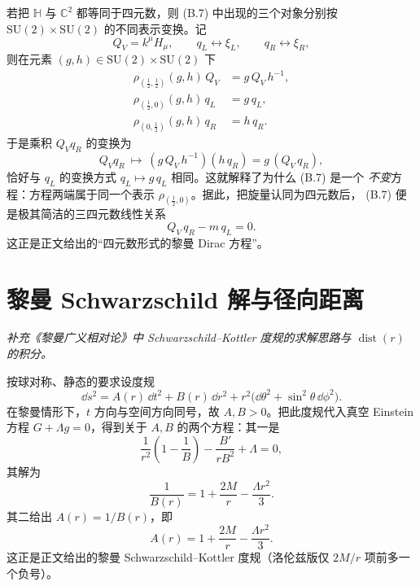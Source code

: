 若把 $\mathbb{H}$ 与 $\mathbb{C}^{2}$ 都等同于四元数，则 (B.7) 中出现的三个对象分别按
$\mathrm{SU}(2)\times\mathrm{SU}(2)$ 的不同表示变换。记
\begin{equation}
Q_{V}=k^{\mu}H_{\mu},\qquad q_{L}\leftrightarrow \xi_{L},\qquad q_{R}\leftrightarrow\xi_{R},
\end{equation}
则在元素 $(g,h)\in \mathrm{SU}(2)\times\mathrm{SU}(2)$ 下
\begin{align}
\rho_{(\frac12,\frac12)}(g,h)\,Q_{V}&=g\,Q_{V}\,h^{-1},\\
\rho_{(\frac12,0)}(g,h)\,q_{L}&=g\,q_{L},\\
\rho_{(0,\frac12)}(g,h)\,q_{R}&=h\,q_{R}.
\end{align}
于是乘积 $Q_{V}q_{R}$ 的变换为
\begin{equation}
Q_{V}q_{R}\ \longmapsto\ (g\,Q_{V}\,h^{-1})(h\,q_{R})=g\,(Q_{V}\,q_{R}),
\end{equation}
恰好与 $q_{L}$ 的变换方式 $q_{L}\mapsto g\,q_{L}$ 相同。这就解释了为什么 (B.7) 是一个
\emph{不变}方程：方程两端属于同一个表示 $\rho_{(\frac12,0)}$。据此，把旋量认同为四元数后，
(B.7) 便是极其简洁的三四元数线性关系
\begin{equation}
Q_{V}\,q_{R}-m\,q_{L}=0 . \tag{B.8}
\end{equation}
这正是正文给出的“四元数形式的黎曼 Dirac 方程”。

\section{黎曼 Schwarzschild 解与径向距离}
\emph{补充《黎曼广义相对论》中 Schwarzschild--Kottler 度规的求解思路与 $\operatorname{dist}(r)$ 的积分。}

按球对称、静态的要求设度规
\begin{equation}
\dd s^{2}=A(r)\,\dd t^{2}+B(r)\,\dd r^{2}+r^{2}\bigl(\dd\theta^{2}+\sin^{2}\theta\,\dd\phi^{2}\bigr).
\end{equation}
在黎曼情形下，$t$ 方向与空间方向同号，故 $A,B>0$。把此度规代入真空 Einstein 方程
$G+\Lambda g=0$，得到关于 $A,B$ 的两个方程：其一是
\begin{equation}
\frac{1}{r^{2}}\left(1-\frac{1}{B}\right)-\frac{B'}{rB^{2}}+\Lambda=0,
\end{equation}
其解为
\begin{equation}
\frac{1}{B(r)}=1+\frac{2M}{r}-\frac{\Lambda r^{2}}{3}.
\end{equation}
其二给出 $A(r)=1/B(r)$，即
\begin{equation}
A(r)=1+\frac{2M}{r}-\frac{\Lambda r^{2}}{3}.
\end{equation}
这正是正文给出的黎曼 Schwarzschild--Kottler 度规（洛伦兹版仅 $2M/r$ 项前多一个负号）。

